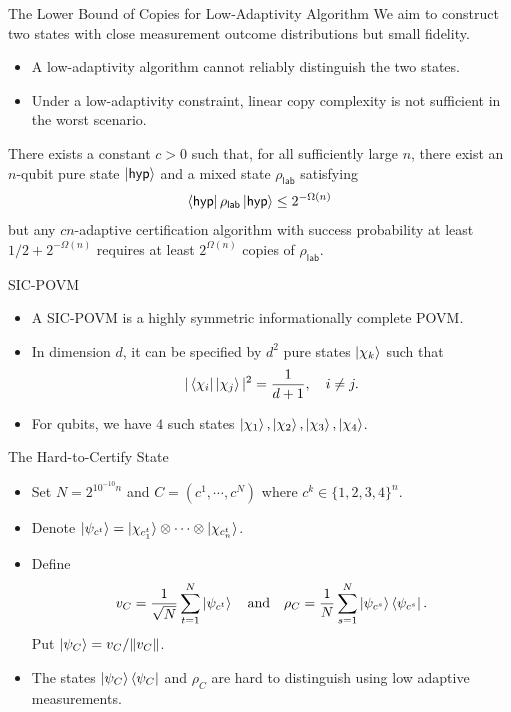 \begin{frame}{The Lower Bound of Copies for Low-Adaptivity Algorithm}
We aim to construct two states with close measurement outcome distributions but small fidelity.
\begin{itemize}
\item
A low-adaptivity algorithm cannot reliably distinguish the two states.
\item
Under a low-adaptivity constraint, linear copy complexity is not sufficient in the worst scenario.
\end{itemize}

\begin{theorem}[Theorem 2]
There exists a constant $c>0$ such that, for all sufficiently large $n$, there exist an $n$-qubit pure state $\ket{\mathsf{hyp}}$ and a mixed state $\rho_{\mathsf{lab}}$ satisfying
\begin{align*}
\bra{\mathsf{hyp}}\rho_{\mathsf{lab}}\ket{\mathsf{hyp}}
\le 2^{-\Omega(n)}
\end{align*}
but any $cn$-adaptive certification algorithm with success probability at least $1/2+2^{-\Omega(n)}$ requires at least $2^{\Omega(n)}$ copies of $\rho_{\mathsf{lab}}$.
\end{theorem}
\end{frame}

\begin{frame}{SIC-POVM}
\begin{itemize}
\item
A SIC-POVM is a highly symmetric informationally complete POVM.
\item
In dimension $d$, it can be specified by $d^2$ pure states $\ket{\chi_k}$ such that
\begin{align*}
|\bra{\chi_i}\ket{\chi_j}|^2=\frac{1}{d+1},\quad i\neq j.
\end{align*}
\item
For qubits, we have $4$ such states $\ket{\chi_1},\ket{\chi_2},\ket{\chi_3},\ket{\chi_4}$.
\end{itemize}
\end{frame}

\begin{frame}{The Hard-to-Certify State}
\begin{itemize}
\item
Set $N=2^{10^{-10}n}$ and $C=(c^1,\cdots,c^N)$ where $c^k\in\{1,2,3,4\}^n$.
\item
Denote $\ket{\psi_{c^t}}=\ket{\chi_{c^t_1}}\otimes\cdots\otimes\ket{\chi_{c^t_n}}$.
\item
Define
\begin{align*}
v_C=\frac{1}{\sqrt{N}}\sum_{t=1}^N\ket{\psi_{c^t}}\quad\text{and}\quad\rho_C=\frac{1}{N}\sum_{s=1}^N\ket{\psi_{c^s}}\bra{\psi_{c^s}}.
\end{align*}
Put $\ket{\psi_C}={v_C}/{\|v_C\|}$.
\item
The states $\ket{\psi_C}\bra{\psi_C}$ and $\rho_C$ are hard to distinguish using low adaptive measurements.
\end{itemize}
\end{frame}

